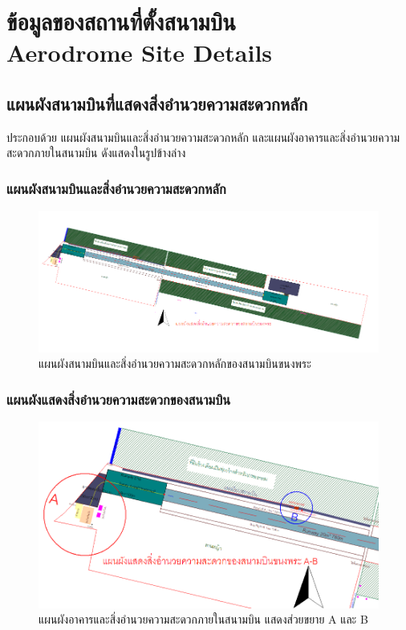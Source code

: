 
\chapter{ข้อมูลของสถานที่ตั้งสนามบิน \\
Aerodrome Site Details}

\section{แผนผังสนามบินที่แสดงสิ่งอำนวยความสะดวกหลัก}

ประกอบด้วย แผนผังสนามบินและสิ่งอำนวยความสะดวกหลัก และแผนผังอาคารและสิ่งอำนวยความสะดวกภายในสนามบิน ดังแสดงในรูปข้างล่าง

\subsection{แผนผังสนามบินและสิ่งอำนวยความสะดวกหลัก}

\begin{figure}[ht!]
\begin{center}
\includegraphics[scale=1.0]{images/Picture1.png}
\caption{แผนผังสนามบินและสิ่งอำนวยความสะดวกหลักของสนามบินขนงพระ}
\label{default}
\end{center}
\end{figure}

\newpage
\subsection{แผนผังแสดงสิ่งอำนวยความสะดวกของสนามบิน}

\begin{figure}[h!]
\begin{center}
\includegraphics[scale=0.75]{images/Picture2.png}
\caption{แผนผังอาคารและสิ่งอำนวยความสะดวกภายในสนามบิน แสดงส่วยขยาย A และ B}
\label{default}
\end{center}
\end{figure}

